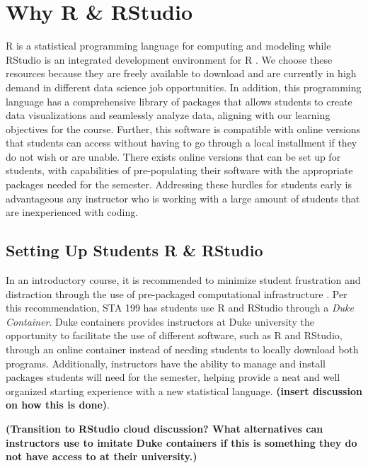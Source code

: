 \documentclass[
  12pt]{article}
\begin{document}
\hypertarget{why-r-rstudio}{%
\section{Why R \& RStudio}\label{why-r-rstudio}}

R is a statistical programming language for computing and modeling while
RStudio is an integrated development environment for R \citep{Rcite}. We
choose these resources because they are freely available to download and
are currently in high demand in different data science job
opportunities. In addition, this programming language has a
comprehensive library of packages that allows students to create data
visualizations and seamlessly analyze data, aligning with our learning
objectives for the course. Further, this software is compatible with
online versions that students can access without having to go through a
local installment if they do not wish or are unable. There exists online
versions that can be set up for students, with capabilities of
pre-populating their software with the appropriate packages needed for
the semester. Addressing these hurdles for students early is
advantageous any instructor who is working with a large amount of
students that are inexperienced with coding.

\hypertarget{setting-up-students-r-rstudio}{%
\subsection{Setting Up Students R \&
RStudio}\label{setting-up-students-r-rstudio}}

In an introductory course, it is recommended to minimize student
frustration and distraction through the use of pre-packaged
computational infrastructure \citep{Rundel2018}. Per this
recommendation, STA 199 has students use R and RStudio through a
\emph{Duke Container}. Duke containers provides instructors at Duke
university the opportunity to facilitate the use of different software,
such as R and RStudio, through an online container instead of needing
students to locally download both programs. Additionally, instructors
have the ability to manage and install packages students will need for
the semester, helping provide a neat and well organized starting
experience with a new statistical language. \textbf{(insert discussion
on how this is done)}.

\textbf{(Transition to RStudio cloud discussion? What alternatives can
instructors use to imitate Duke containers if this is something they do
not have access to at their university.)}
\end{document}
